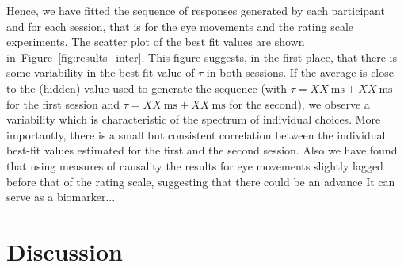 \documentclass[12pt,english]{article}%
\newcommand{\ms}{\si{\milli\second}}%
\newcommand{\seeFig}[1]{Figure~\ref{fig:#1}}
\newcommand{\AM}[1]{\textbf{\textcolor{blue}{[AM: #1]}}}
\begin{document}
Hence, we have fitted the sequence of responses generated by each participant and
for each session, that is for the eye movements and the rating scale experiments.
The scatter plot of the best fit values are shown in~\seeFig{results_inter}.
This figure suggests, in the first place, that there is some variability in the best fit value of $\tau$
in both sessions.
If the average is close to the (hidden) value used to generate the sequence
(with $\tau = XX~\ms \pm XX~\ms$ for the first session and
 $\tau = XX~\ms \pm XX~\ms$ for the second),
 we observe a variability which is characteristic of the spectrum of individual choices.
More importantly, there is a small but consistent
correlation between the individual best-fit values estimated for the first and the second session.
Also we have found that using measures of causality %
the results for eye movements slightly lagged before
that of the rating scale,
suggesting that there could be an advance
It can serve as a biomarker...


\section{Discussion}

\label{sec:outro}
\end{document}

